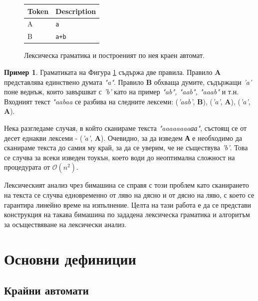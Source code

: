 \documentclass[12pt, oneside]{article}
\theoremstyle{definition}
\newtheorem{example}{Пример}[section]
\begin{document}
\begin{figure}[!htb]
	\begin{center}
		\begin{tabular}{ |l|l| } 
		\hline
		Token & Description \\
		\hline
		A & \verb/а/ \\
		B & \verb/a+b/ \\
		\hline
		\end{tabular}
	\end{center}
	\centering
	\begingroup
		
	\endgroup
	\label{fig:Lexgr2}
	\caption{Лексическа граматика и построеният по нея краен автомат.}
\end{figure}

\begin{example}
	Граматиката на Фигура \ref{fig:Lexgr2} съдържа две правила. Правило \textbf{A} представлява единствено думата \emph{"a"}. Правило \textbf{B} обхваща думите, съдържащи \emph{'a'} поне веднъж, които завършват с \emph{'b'} като на пример \emph{"ab", "aab", "aaab"} и т.н. Входният текст \emph{"aabaa} се разбива на следните лексеми: (\emph{'aab'}, \textbf{B}), (\emph{'a'}, \textbf{A}), (\emph{'a'}, \textbf{A}).

	Нека разгледаме случая, в който сканираме текста \emph{"aaaaaaaaаа"}, състоящ се от десет еднакви лексеми - (\emph{'a'}, \textbf{A}). Очевидно, за да изведем \textbf{А} е необходимо да сканираме текста до самия му край, за да се уверим, че не съществува \emph{'b'}. Това се случва за всеки изведен тоукън, което води до неоптимална сложност на процедурата от \( \mathcal{O}(n^2) \).
\end{example}

Лексическият анализ чрез бимашина се справя с този проблем като сканирането на текста се случва едновременно от ляво на дясно и от дясно на ляво, с което се гарантира линейно време на изпълнение. Целта на тази работа е да се представи конструкция на такава бимашина по зададена лексическа граматика и алгоритъм за осъществяване на лексически анализ.

\pagebreak
\section{Основни дефиниции}

\subsection{Крайни автомати}
\end{document}
